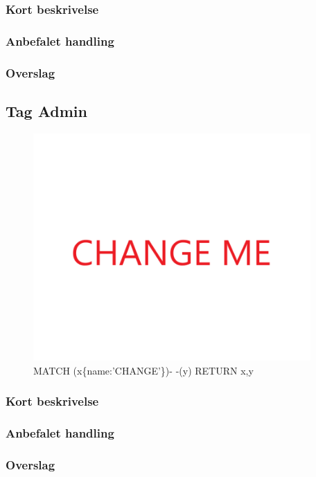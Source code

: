 \documentclass{article}
\begin{document}
\subsubsection{Kort beskrivelse}
\subsubsection{Anbefalet handling}
\subsubsection{Overslag}
\subsection{Tag Admin}
\begin{figure}[h]
\includegraphics[width=300pt]{CHANGE.PNG}
\caption{MATCH (x\{name:'CHANGE'\})- -(y) RETURN x,y}
\end{figure}
\subsubsection{Kort beskrivelse}
\subsubsection{Anbefalet handling}
\subsubsection{Overslag}
\end{document}
